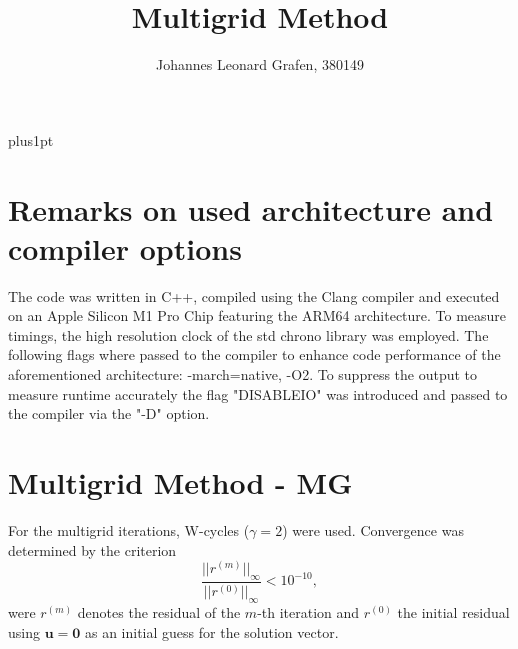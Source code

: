 \documentclass[11pt,a4paper]{article}
\title{Multigrid Method}
\author{Johannes Leonard Grafen, 380149}
\begin{document}
\renewcommand\baselinestretch{1.0}
\baselineskip=18pt plus1pt	

\maketitle
\newpage
{}
\tableofcontents
\listoffigures	%
\newpage

\section{Remarks on used architecture and compiler options}
The code was written in C++, compiled using the Clang compiler and executed on an Apple Silicon M1 Pro Chip featuring the ARM64 architecture. To measure timings, the high resolution clock of the std chrono library was employed. The following flags where passed to the compiler to enhance code performance of the aforementioned architecture: -march=native, -O2. To suppress the output to measure runtime accurately the flag "DISABLEIO" was introduced and passed to the compiler via the "-D" option.

\section{Multigrid Method - MG}
\label{chapter:MG}
For the multigrid iterations, W-cycles ($\gamma = 2$) were used. Convergence was determined by the criterion
\begin{equation}
	\frac{|| r^{(m)}||_{\infty}}{|| r^{(0)}||_{\infty}} < 10^{-10} ,
	\label{eq::measure}
\end{equation}
were $r^{(m)}$ denotes the residual of the $m$-th iteration and $r^{(0)}$ the initial residual using $\mathbf{u} = \mathbf{0}$ as an initial guess for the solution vector.
\end{document}
